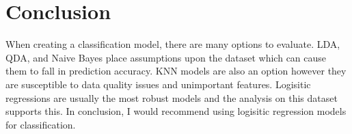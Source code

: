 \documentclass[12pt,letterpaper]{article}
\begin{document}
\section*{Conclusion}

When creating a classification model, there are many options to evaluate. LDA, QDA, and Naive Bayes place assumptions upon the dataset which can cause them to fall in prediction accuracy. KNN models are also an option however they are susceptible to data quality issues and unimportant features. Logisitic regressions are usually the most robust models and the analysis on this dataset supports this. In conclusion, I would recommend using logisitic regression models for classification. 
\end{document}
